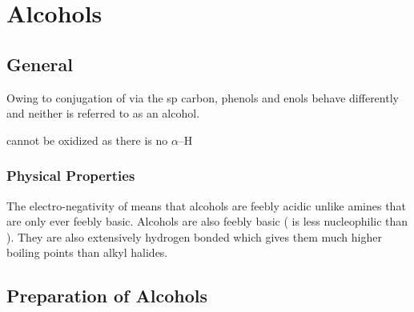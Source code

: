 \section{Alcohols}

\subsection{General}


Owing to conjugation of  via the sp carbon, phenols and enols
behave differently and neither is referred to as an alcohol.


 cannot be oxidized as there is no $\alpha$--H

\subsubsection{Physical Properties}

The electro-negativity of  means that alcohols are feebly acidic unlike
amines that are only ever feebly basic. Alcohols are also feebly basic (
is less nucleophilic than ). They are also extensively hydrogen bonded
which gives them much higher boiling points than alkyl halides.

\subsection{Preparation of Alcohols}

